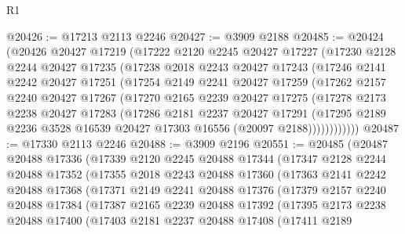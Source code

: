 \begin{lexlean}{R1}
\begin{coremodule}
@20426 := @17213 @2113 @2246
@20427 := @3909 @2188
@20485 := @20424
    (@20426
      @20427
      @17219
      (@17222
        @2120
        @2245
        @20427
        @17227
        (@17230
          @2128
          @2244
          @20427
          @17235
          (@17238
            @2018
            @2243
            @20427
            @17243
            (@17246
              @2141
              @2242
              @20427
              @17251
              (@17254
                @2149
                @2241
                @20427
                @17259
                (@17262
                  @2157
                  @2240
                  @20427
                  @17267
                  (@17270
                    @2165
                    @2239
                    @20427
                    @17275
                    (@17278
                      @2173
                      @2238
                      @20427
                      @17283
                      (@17286
                        @2181
                        @2237
                        @20427
                        @17291
                        (@17295
                          @2189
                          @2236
                          @3528
                          @16539
                          @20427
                          @17303
                          @16556
                          (@20097 @2188))))))))))))
@20487 := @17330 @2113 @2246
@20488 := @3909 @2196
@20551 := @20485
    (@20487
      @20488
      @17336
      (@17339
        @2120
        @2245
        @20488
        @17344
        (@17347
          @2128
          @2244
          @20488
          @17352
          (@17355
            @2018
            @2243
            @20488
            @17360
            (@17363
              @2141
              @2242
              @20488
              @17368
              (@17371
                @2149
                @2241
                @20488
                @17376
                (@17379
                  @2157
                  @2240
                  @20488
                  @17384
                  (@17387
                    @2165
                    @2239
                    @20488
                    @17392
                    (@17395
                      @2173
                      @2238
                      @20488
                      @17400
                      (@17403
                        @2181
                        @2237
                        @20488
                        @17408
                        (@17411
                          @2189

\end{coremodule}
\end{lexlean}
